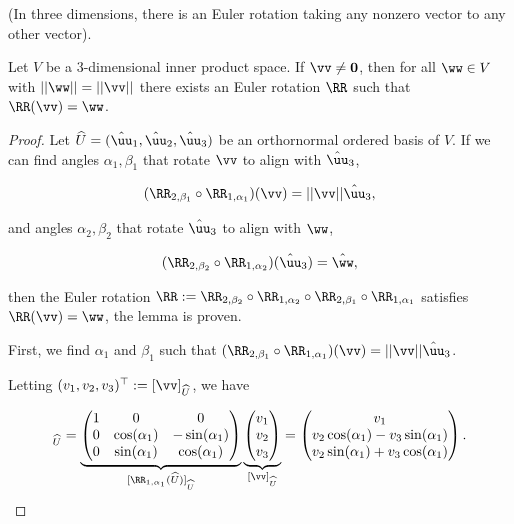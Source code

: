 \begin{lemma}
    (In three dimensions, there is an Euler rotation taking any nonzero vector to any other vector).

    Let $V$ be a $3$-dimensional inner product space. If $\vv \neq \mathbf{0}$, then for all $\ww \in V$ with $||\ww|| = ||\vv||$ there exists an Euler rotation $\RR$ such that $\RR(\vv) = \ww$.
\end{lemma}

\begin{proof}
    Let $\hU = (\huu_1, \huu_2, \huu_3)$ be an orthornormal ordered basis of $V$. If we can find angles $\alpha_1, \beta_1$ that rotate $\vv$ to align with $\huu_3$,

    \begin{align*}
        (\RR_{2, \beta_1} \circ \RR_{1, \alpha_1})(\vv) = ||\vv||\huu_3,
    \end{align*}
    
    and angles $\alpha_2, \beta_2$ that rotate $\huu_3$ to align with $\ww$, 

    \begin{align*}
        (\RR_{2, \beta_2} \circ \RR_{1, \alpha_2})(\huu_3) = \hww,
    \end{align*}

    then the Euler rotation $\RR := \RR_{2, \beta_2} \circ \RR_{1, \alpha_2} \circ \RR_{2, \beta_1} \circ \RR_{1, \alpha_1}$ satisfies $\RR(\vv) = \ww$, the lemma is proven.

    \vspace{.5cm}

    First, we find $\alpha_1$ and $\beta_1$ such that $(\RR_{2, \beta_1} \circ \RR_{1, \alpha_1})(\vv) = ||\vv||\huu_3$.

    Letting $(v_1, v_2, v_3)^\top := [\vv]_{\hU}$, we have
    
    \begin{align*}
        [\RR_{1, \alpha_1}(\vv)]_{\hU} =
        \underbrace
        {
            \begin{pmatrix}
                1 & 0 & 0 \\
                0 & \cos(\alpha_1) & -\sin(\alpha_1) \\
                0 & \sin(\alpha_1) & \cos(\alpha_1)
            \end{pmatrix}
        }_{[\RR_{1, \alpha_1}(\hU)]_{\hU}}
        \underbrace
        {
            \begin{pmatrix}
                v_1 \\ v_2 \\ v_3
            \end{pmatrix}
        }_{[\vv]_{\hU}}
        =
        \begin{pmatrix}
            v_1 \\
            v_2 \cos(\alpha_1) - v_3 \sin(\alpha_1) \\
            v_2 \sin(\alpha_1) + v_3 \cos(\alpha_1)
        \end{pmatrix}.
    \end{align*}


\end{proof}
